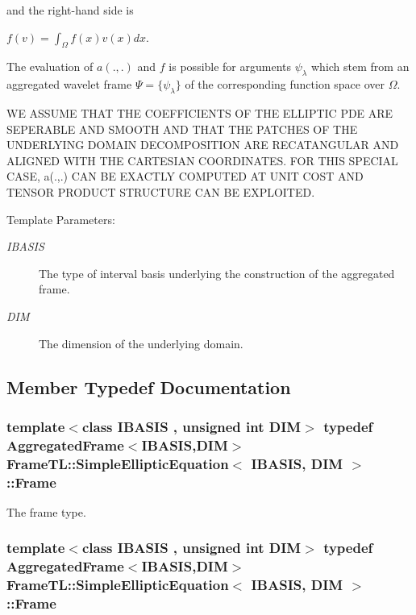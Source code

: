 and the right-hand side is

$f(v) = \int_\Omega f(x) v(x) dx$.

The evaluation of $a(.,.)$ and $f$ is possible for arguments $\psi_\lambda$ which stem from an aggregated wavelet frame $\Psi=\{\psi_\lambda\}$ of the corresponding function space over $\Omega$.

WE ASSUME THAT THE COEFFICIENTS OF THE ELLIPTIC PDE ARE SEPERABLE AND SMOOTH AND THAT THE PATCHES OF THE UNDERLYING DOMAIN DECOMPOSITION ARE RECATANGULAR AND ALIGNED WITH THE CARTESIAN COORDINATES. FOR THIS SPECIAL CASE, a(.,.) CAN BE EXACTLY COMPUTED AT UNIT COST AND TENSOR PRODUCT STRUCTURE CAN BE EXPLOITED.

\begin{Desc}
\item[Template Parameters:]
\begin{description}
\item[{\em IBASIS}]The type of interval basis underlying the construction of the aggregated frame. \item[{\em DIM}]The dimension of the underlying domain. \end{description}
\end{Desc}


\subsection{Member Typedef Documentation}
\hypertarget{classFrameTL_1_1SimpleEllipticEquation_b048afa8f64d6e76d33b1ae60686010a}{
\subsubsection[{Frame}]{\setlength{\rightskip}{0pt plus 5cm}template$<$class IBASIS , unsigned int DIM$>$ {\bf typedef} {\bf AggregatedFrame}$<$IBASIS,DIM$>$ {\bf FrameTL::SimpleEllipticEquation}$<$ IBASIS, DIM $>$::{\bf Frame}}}
\label{classFrameTL_1_1SimpleEllipticEquation_b048afa8f64d6e76d33b1ae60686010a}


The frame type. \hypertarget{classFrameTL_1_1SimpleEllipticEquation_b048afa8f64d6e76d33b1ae60686010a}{
\subsubsection[{Frame}]{\setlength{\rightskip}{0pt plus 5cm}template$<$class IBASIS , unsigned int DIM$>$ {\bf typedef} {\bf AggregatedFrame}$<$IBASIS,DIM$>$ {\bf FrameTL::SimpleEllipticEquation}$<$ IBASIS, DIM $>$::{\bf Frame}}}
\label{classFrameTL_1_1SimpleEllipticEquation_b048afa8f64d6e76d33b1ae60686010a}


